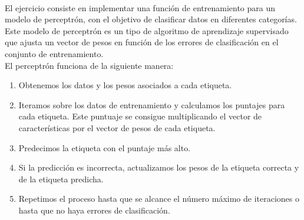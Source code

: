 \documentclass{report}
\begin{document}
        \paragraph*{}{
          El ejercicio consiste en implementar una función de entrenamiento para un modelo de perceptrón, con el objetivo de clasificar datos en diferentes categorías. 
          Este modelo de perceptrón es un tipo de algoritmo de aprendizaje supervisado que ajusta un vector de pesos en función de los errores de clasificación en el conjunto de entrenamiento.\\

          El perceptrón funciona de la siguiente manera:
          \begin{enumerate}
            \item Obtenemos los datos y los pesos asociados a cada etiqueta.
            \item Iteramos sobre los datos de entrenamiento y calculamos los puntajes para cada etiqueta. Este puntuaje se consigue multiplicando el vector de características por el vector de pesos de cada etiqueta.
            \item Predecimos la etiqueta con el puntaje más alto.
            \item Si la predicción es incorrecta, actualizamos los pesos de la etiqueta correcta y de la etiqueta predicha.
            \item Repetimos el proceso hasta que se alcance el número máximo de iteraciones o hasta que no haya errores de clasificación.
          \end{enumerate}
        }
\end{document}
